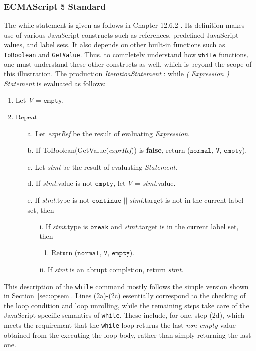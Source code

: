 \documentclass[a4paper,11pt,twoside]{report}
\begin{document}
\subsubsection{ECMAScript 5 Standard} 
The while statement is given as follows in Chapter 12.6.2 \cite{EcmaScript}. Its definition makes use of various JavaScript constructs such as references, predefined JavaScript values, and label sets. It also depends on other built-in functions such as \texttt{ToBoolean} and \texttt{GetValue}. Thus, to completely understand how $\mathtt{while}$ functions, one must understand these other constructs as well, which is beyond the scope of this illustration. The production \textit{IterationStatement} : while \textit{( Expression ) Statement} is evaluated as follows:
\begin{enumerate}
\setlength{\itemsep}{0cm}
\item Let \textit{V} = $\texttt{empty}$.
\item Repeat
\begin{enumerate}
\setlength{\itemsep}{0cm}
\item[a.] Let \textit{exprRef} be the result of evaluating \textit{Expression}.
\item[b.] If ToBoolean(GetValue(\textit{exprRef})) is \textbf{false}, return ($\texttt{normal, {V}, empty}$).
\item[c.] Let \textit{stmt} be the result of evaluating \textit{Statement}.
\item[d.]If \textit{stmt}.value is not $\texttt{empty}$, let \textit{V} = \textit{stmt}.value.
\item[e.]If \textit{stmt}.type is not $\texttt{continue}$ $||$ \textit{stmt}.target is not in the current label set, then
\begin{enumerate}
\item[i.] If \textit{stmt}.type is $\texttt{break}$ and \textit{stmt}.target is in the current label set, then
\begin{enumerate} 
\item Return ($\texttt{normal, {V}, empty}$).
\end{enumerate}
\item[ii.] If \textit{stmt} is an abrupt completion, return \textit{stmt}.
\end{enumerate}
\end{enumerate}
\end{enumerate}

\noindent This description of the \texttt{while} command mostly follows the simple version shown in Section~\ref{sec:opsem}. Lines (2a)-(2c) essentially correspond to the checking of the loop condition and loop unrolling, while the remaining steps take care of the JavaScript-specific semantics of \texttt{while}. These include, for one, step (2d), which meets the requirement that the \texttt{while} loop returns the last {\em non-empty} value obtained from the executing the loop body, rather than simply returning the last one.
\end{document}
